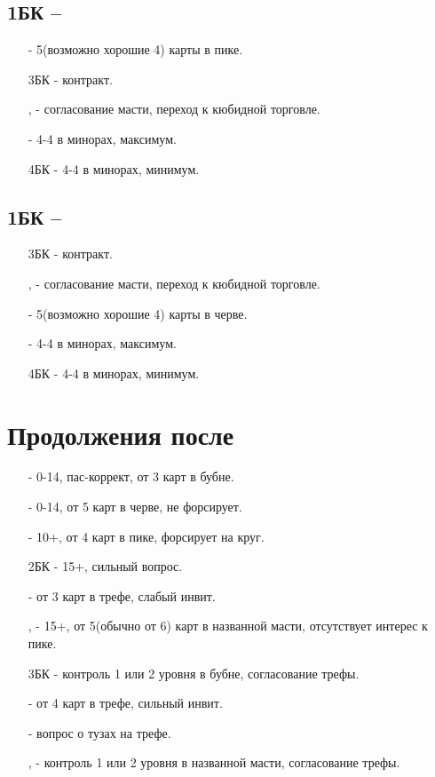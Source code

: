 \documentclass{article}
\begin{document}
\subsection{1БК -- }
\begin{enumerate}
    \item[\sp{3}] - 5(возможно хорошие 4) карты в пике. 
    \item[3БК] - контракт.
    \item[\cl{4}, \di{4}] - согласование масти, переход к кюбидной торговле.
    \item[\he{4}] - 4-4 в минорах, максимум.
    \item[4БК] - 4-4 в минорах, минимум.
\end{enumerate}
\subsection{1БК -- }
\begin{enumerate}
    \item[3БК] - контракт.
    \item[\cl{4}, \di{4}] - согласование масти, переход к кюбидной торговле.
    \item[\he{4}] - 5(возможно хорошие 4) карты в черве. 
    \item[\sp{4}] - 4-4 в минорах, максимум.
    \item[4БК] - 4-4 в минорах, минимум.
\end{enumerate}
\section{Продолжения после }
\begin{enumerate}
    \item[\di{2}] - 0-14, пас-коррект, от 3 карт в бубне.
    \item[\he{2}] - 0-14, от 5 карт в черве, не форсирует.
    \item[\sp{2}] - 10+, от 4 карт в пике, форсирует на круг.
    \item[2БК] - 15+, сильный вопрос.
    \item[\cl{3}] - от 3 карт в трефе, слабый инвит.
    \item[\di{3}, \he{3}] - 15+, от 5(обычно от 6) карт в названной масти, отсутствует интерес к пике. 
    \item[3БК] - контроль 1 или 2 уровня в бубне, согласование трефы.
    \item[\cl{4}] - от 4 карт в трефе, сильный инвит.
    \item[\di{4}] - вопрос о тузах на трефе.
    \item[\sp{3}, \he{4}] - контроль 1 или 2 уровня в названной масти, согласование трефы.
\end{enumerate}
\end{document}
